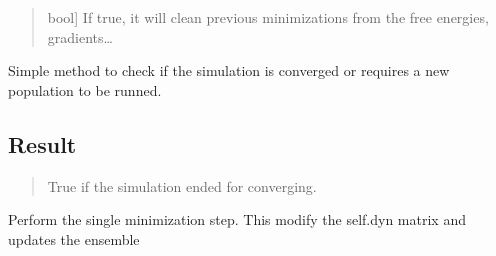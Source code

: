 \documentclass[a4paper,11pt,english]{sphinxmanual}
\begin{document}
\begin{fulllineitems}
\begin{fulllineitems}
\begin{quote}
\begin{description}
\sphinxlineitem{delete\_previous\_data}{[}bool{]}
\sphinxAtStartPar
If true, it will clean previous minimizations from the free energies, gradients…

\end{description}
\end{quote}

\end{fulllineitems}


\begin{fulllineitems}
\label{\detokenize{apireference:sscha.SchaMinimizer.SSCHA_Minimizer.is_converged}}
\pysigstartsignatures
{}
\pysigstopsignatures
\sphinxAtStartPar
Simple method to check if the simulation is converged or
requires a new population to be runned.


\subsection{Result}
\label{\detokenize{apireference:id34}}\begin{quote}
\begin{description}
\sphinxAtStartPar
True if the simulation ended for converging.

\end{description}
\end{quote}

\end{fulllineitems}


\begin{fulllineitems}
\label{\detokenize{apireference:sscha.SchaMinimizer.SSCHA_Minimizer.minimization_step}}
\pysigstartsignatures
{}
\pysigstopsignatures
\sphinxAtStartPar
Perform the single minimization step.
This modify the self.dyn matrix and updates the ensemble



\end{fulllineitems}
\end{fulllineitems}
\end{document}

